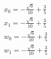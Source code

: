 \begin{problem}

\end{problem}


\begin{solution}
\begin{align}
x_0 = - \frac{\sqrt{6}}{10} + \frac{3}{5} \\
x_1 = - \frac{\sqrt{6}}{10} + \frac{3}{5} \\
w_0 = - \frac{\sqrt{6}}{10} + \frac{3}{5} \\
w_1 = - \frac{\sqrt{6}}{10} + \frac{3}{5} \\
\end{align}
\end{solution}

